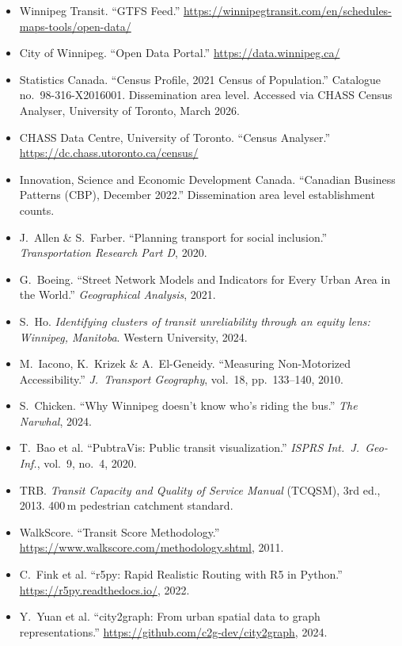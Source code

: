 \documentclass[11pt]{article}
\begin{document}
\scriptsize
\begin{itemize}[leftmargin=*,itemsep=0pt]
    \item Winnipeg Transit. ``GTFS Feed.'' \url{https://winnipegtransit.com/en/schedules-maps-tools/open-data/}
    \item City of Winnipeg. ``Open Data Portal.'' \url{https://data.winnipeg.ca/}
    \item Statistics Canada. ``Census Profile, 2021 Census of Population.'' Catalogue no.\ 98-316-X2016001. Dissemination area level. Accessed via CHASS Census Analyser, University of Toronto, March 2026.
    \item CHASS Data Centre, University of Toronto. ``Census Analyser.'' \url{https://dc.chass.utoronto.ca/census/}
    \item Innovation, Science and Economic Development Canada. ``Canadian Business Patterns (CBP), December 2022.'' Dissemination area level establishment counts.
    \item J.\ Allen \& S.\ Farber. ``Planning transport for social inclusion.'' \textit{Transportation Research Part D}, 2020.
    \item G.\ Boeing. ``Street Network Models and Indicators for Every Urban Area in the World.'' \textit{Geographical Analysis}, 2021.
    \item S.\ Ho. \textit{Identifying clusters of transit unreliability through an equity lens: Winnipeg, Manitoba}. Western University, 2024.
    \item M.\ Iacono, K.\ Krizek \& A.\ El-Geneidy. ``Measuring Non-Motorized Accessibility.'' \textit{J.\ Transport Geography}, vol.\ 18, pp.\ 133--140, 2010.
    \item S.\ Chicken. ``Why Winnipeg doesn't know who's riding the bus.'' \textit{The Narwhal}, 2024.
    \item T.\ Bao et al. ``PubtraVis: Public transit visualization.'' \textit{ISPRS Int.\ J.\ Geo-Inf.}, vol.\ 9, no.\ 4, 2020.
    \item TRB. \textit{Transit Capacity and Quality of Service Manual} (TCQSM), 3rd ed., 2013. 400\,m pedestrian catchment standard.
    \item WalkScore. ``Transit Score Methodology.'' \url{https://www.walkscore.com/methodology.shtml}, 2011.
    \item C.\ Fink et al. ``r5py: Rapid Realistic Routing with R5 in Python.'' \url{https://r5py.readthedocs.io/}, 2022.
    \item Y.\ Yuan et al. ``city2graph: From urban spatial data to graph representations.'' \url{https://github.com/c2g-dev/city2graph}, 2024.

\end{itemize}
\end{document}
